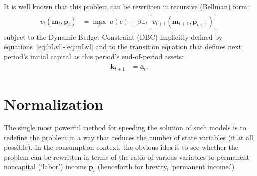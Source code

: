 \documentclass[titlepage, headings=optiontotocandhead]{Resources/texmf-local/tex/latex/econtex}
\begin{document}
It is well known that this problem can be rewritten in recursive (Bellman) form:
  \begin{equation}\begin{gathered}\begin{aligned}
        v_{t}(\mathbf{m}_{t},\mathbf{p}_{t})  & = \max_{c}~ u(c) + \beta {\mathbb{E}}_{t}[ v_{t+1}(\mathbf{m}_{t+1},\mathbf{p}_{t+1})]\label{eq:vrecurse}
      \end{aligned}\end{gathered}\end{equation}
subject to the Dynamic Budget Constraint (DBC) implicitly defined by equations~\eqref{eq:bLvl}-\eqref{eq:mLvl} and to the transition equation that defines next period's initial capital as this period's end-of-period assets:
\begin{equation}\begin{gathered}\begin{aligned}
      \mathbf{k}_{t+1} & = \mathbf{a}_{t}. \label{eq:transitionstate}
    \end{aligned}\end{gathered}\end{equation}



\hypertarget{normalization}{}
\section{Normalization}\label{sec:normalization}

The single most powerful method for speeding the solution of such models is to redefine the problem in a way that reduces the number of state variables (if at all possible).  In the consumption context, the obvious idea is to see whether the problem can be rewritten in terms of the ratio of various variables to permanent noncapital (`labor') income $\mathbf{p}_{t}$ (henceforth for brevity, `permanent income.')
\end{document}
